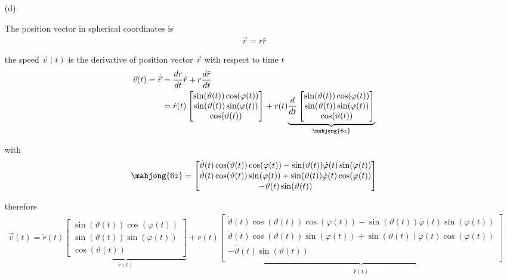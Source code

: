 \documentclass[11pt,a4paper]{article}
\begin{document}
\begin{enumerate}
\item[(d)]

The position vector in spherical coordinates is
\begin{align*}
\vec{r}=r\hat{r}
\end{align*}

the speed $\vec{v}(t)$ is the derivative of position vector $\vec{r}$ with respect to time $t$
\begin{align*}
\vec{v}(t)=\dot{\vec{r}}
&=\frac{dr}{dt}\hat{r}+r\frac{d\hat{r}}{dt} \\
&=
\dot{r}(t)
\begin{bmatrix}
\sin(\vartheta(t))\cos(\varphi(t)) \\
\sin(\vartheta(t))\sin(\varphi(t)) \\
\cos(\vartheta(t))
\end{bmatrix}
+
r(t)
\underset{\mahjong{6z}}{\underbrace{
\frac{d}{dt}
\begin{bmatrix}
\sin(\vartheta(t))\cos(\varphi(t)) \\
\sin(\vartheta(t))\sin(\varphi(t)) \\
\cos(\vartheta(t))
\end{bmatrix}
}} \\
\end{align*}

with
\begin{align*}
\mahjong{6z}
&=
\begin{bmatrix}
\dot{\vartheta}(t)\cos(\vartheta(t))\cos(\varphi(t))-\sin(\vartheta(t))\dot{\varphi}(t)\sin(\varphi(t)) \\
\dot{\vartheta}(t)\cos(\vartheta(t))\sin(\varphi(t))+\sin(\vartheta(t))\dot{\varphi}(t)\cos(\varphi(t)) \\
-\dot{\vartheta}(t)\sin(\vartheta(t)) \\
\end{bmatrix} \\
\end{align*}

therefore
\begin{align}
\vec{v}(t)=
\dot{r}(t)
\underset{\hat{r}(t)}{\underbrace{
\begin{bmatrix}
\sin(\vartheta(t))\cos(\varphi(t)) \\
\sin(\vartheta(t))\sin(\varphi(t)) \\
\cos(\vartheta(t))
\end{bmatrix}
}}
+
r(t)
\underset{\dot{\hat{r}}(t)}{\underbrace{
\begin{bmatrix}
\dot{\vartheta}(t)\cos(\vartheta(t))\cos(\varphi(t))-\sin(\vartheta(t))\dot{\varphi}(t)\sin(\varphi(t)) \\
\dot{\vartheta}(t)\cos(\vartheta(t))\sin(\varphi(t))+\sin(\vartheta(t))\dot{\varphi}(t)\cos(\varphi(t)) \\
-\dot{\vartheta}(t)\sin(\vartheta(t)) \\
\end{bmatrix}
}}
\end{align}


\end{enumerate}
\end{document}
